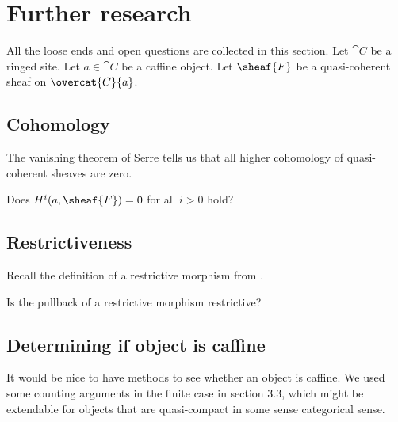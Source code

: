 \chapter{Further research} %

All the loose ends and open questions are collected in this section.
Let $\cat{C}$ be a ringed site.
Let $a\in \cat{C}$ be a caffine object.
Let $\sheaf{F}$ be a quasi-coherent sheaf on $\overcat{C}{a}$.

\section*{Cohomology}
The vanishing theorem of Serre tells us that all higher cohomology
of quasi-coherent sheaves are zero.\cite[\href{http://stacks.math.columbia.edu/tag/01XB}{Tag 01XB}]{stacks}

\begin{question}
Does $H^i(a,\sheaf{F}) = 0$ for all $i>0$ hold?
\end{question}

\section*{Restrictiveness}
Recall the definition of a restrictive morphism from .

\begin{question}
Is the pullback of a restrictive morphism restrictive?
\end{question}

\section*{Determining if object is caffine}
It would be nice to have methods to see whether an object is caffine.
We used some counting arguments in the finite case in section 3.3, 
which might be extendable for objects that are quasi-compact in some sense categorical sense.
